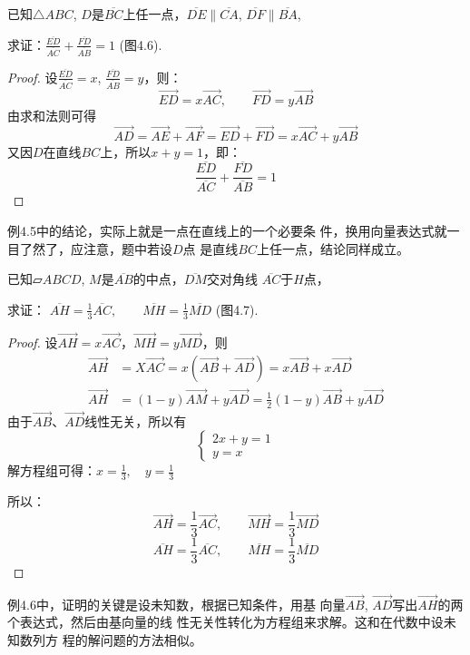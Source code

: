 \begin{example}
    已知$\triangle ABC$, $D$是$\overline{BC}$上任一点，$\overline{DE}\parallel \overline{CA}$, 
$\overline{DF}\parallel\overline{BA}$, 

求证：$\frac{\overline{ED}}{\overline{AC}}+\frac{\overline{FD}}{\overline{AB}}=1$ (图4.6).
\end{example}

\begin{proof}
设$\frac{\overline{ED}}{\overline{AC}}=x$, $\frac{\overline{FD}}{\overline{AB}}=y$，则：
\[\Vec{ED}=x\Vec{AC},\qquad \Vec{FD}=y\Vec{AB}\]
由求和法则可得
\[\Vec{AD}=\Vec{AE}+\Vec{AF}=\Vec{ED}+\Vec{FD}=x\Vec{AC}+y\Vec{AB}\]
又因$D$在直线$BC$上，所以$x+y=1$，即：
$$\frac{\overline{ED}}{\overline{AC}}+\frac{\overline{FD}}{\overline{AB}}=1$$
\end{proof}

例4.5中的结论，实际上就是一点在直线上的一个必要条
件，换用向量表达式就一目了然了，应注意，题中若设$D$点
是直线$BC$上任一点，结论同样成立。


\begin{example}
    已知$\parallelogram ABCD$, $M$是$\overline{AB}$的中点，$\overline{DM}$交对角线
$\overline{AC}$于$H$点，

求证：
$\overline{AH}=\frac{1}{3} \overline{AC},\qquad \overline{MH}=\frac{1}{3} \overline{MD}$ (图4.7).
\end{example}

\begin{proof}
设$\Vec{AH}=x\Vec{AC}$，$\Vec{MH}=y\Vec{MD}$，则
\[\begin{split}
    \Vec{AH}&=X\Vec{AC}=x\left(\Vec{AB}+\Vec{AD}\right)=x\Vec{AB}+x\Vec{AD}\\
    \Vec{AH}&=(1-y)\Vec{AM}+y\Vec{AD}=\frac{1}{2}(1-y)\Vec{AB}+y\Vec{AD}
\end{split}\]
由于$\Vec{AB}$、$\Vec{AD}$线性无关，所以有
\[\begin{cases}
    2x+y=1\\
    y=x
\end{cases}\]
解方程组可得：$x=\frac{1}{3},\quad y=\frac{1}{3}$

所以：
\[\Vec{AH}=\frac{1}{3}\Vec{AC},\qquad \Vec{MH}=\frac{1}{3}\Vec{MD}\]
\[\overline{AH}=\frac{1}{3}\overline{AC},\qquad \overline{MH}=\frac{1}{3}\overline{MD}\]
\end{proof}

例4.6中，证明的关键是设未知数，根据已知条件，用基
向量$\Vec{AB}$, $\Vec{AD}$写出$\Vec{AH}$的两个表达式，然后由基向量的线
性无关性转化为方程组来求解。这和在代数中设未知数列方
程的解问题的方法相似。

